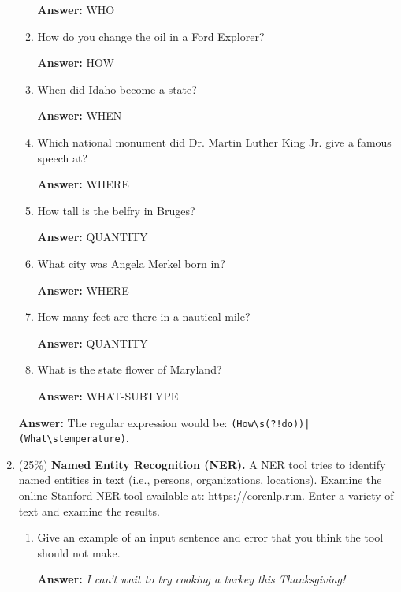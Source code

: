 \documentclass[11pt]{article}
\begin{document}
\begin{enumerate}
\begin{enumerate}
                \textbf{Answer:} WHO

          \item How do you change the oil in a Ford Explorer?

                \textbf{Answer:} HOW

          \item When did Idaho become a state?

                \textbf{Answer:} WHEN

          \item Which national monument did Dr. Martin Luther King Jr. give a famous speech at?

                \textbf{Answer:} WHERE

          \item How tall is the belfry in Bruges?

                \textbf{Answer:} QUANTITY

          \item What city was Angela Merkel born in?

                \textbf{Answer:} WHERE

          \item How many feet are there in a nautical mile?

                \textbf{Answer:} QUANTITY

          \item What is the state flower of Maryland?

                \textbf{Answer:} WHAT-SUBTYPE

        \end{enumerate}

        \textbf{Answer:} The regular expression would be: \texttt{(How\textbackslash s(?!do))|(What\textbackslash stemperature)}.

  \item (25\%) \textbf{Named Entity Recognition (NER).} A NER tool tries to identify named entities in text (i.e., persons, organizations, locations). Examine the online Stanford NER tool available at: https://corenlp.run. Enter a variety of text and examine the results.
        \begin{enumerate}
          \item Give an example of an input sentence and error that you think the tool should not make.

                \textbf{Answer:} \textit{I can't wait to try cooking a turkey this Thanksgiving!}


\end{enumerate}
\end{enumerate}
\end{document}
